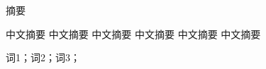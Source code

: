 
\centerline{\heiti 摘\quad 要}

\linespread{1.4} 
\bigskip

中文摘要
中文摘要
中文摘要
中文摘要
中文摘要
中文摘要



\bigskip

{ 词1；词2；词3；}
